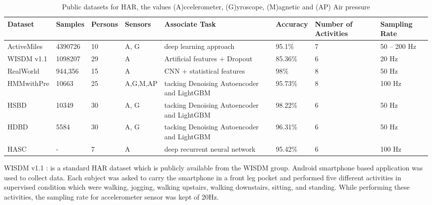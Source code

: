 \documentclass[10pt,halfline,a4paper]{ouparticle}
\begin{document}
\begin{table}[ht]
	\begin{adjustbox}{width=1\textwidth}
	\begin{tabular}{|l|l|l|l|l|l|l|l|}
		\hline
		Dataset     & Samples & Persons & Sensors                                            & Associate Task                             & Accuracy & Number of Activities & Sampling Rate \\ \hline
		ActiveMiles & 4390726                  & 10                & A, G & deep learning approach                     & 95.1\%   & 7                    & 50 – 200 Hz   \\ \hline
		WISDM v1.1  & 1098207                  & 29                & A                                   & Artificial features + Dropout              & 85.36\%  & 6                    & 20 Hz         \\ \hline
		RealWorld   & 944,356                  & 15                & A                                   & CNN + statistical features                 & 98\%     & 8                    & 50 Hz         \\ \hline
		HMMwithPre  & 10663                    & 25                & A,G,M,AP  & tacking Denoising Autoencoder and LightGBM & 95.73\%  & 8                    & 100 Hz        \\ \hline
		HSBD        & 10349                    & 30                & A, G                   & tacking Denoising Autoencoder and LightGBM & 98.22\%  & 6                    & 50 Hz         \\ \hline
		HDBD        & 5584                     & 30                & A, G                      & tacking Denoising Autoencoder and LightGBM & 96.31\%  & 6                    & 50 Hz         \\ \hline
		HASC        & -                        & 7                 & A                              & deep recurrent neural network              & 95.42\%  & 6                    & 100 Hz        \\ \hline
	\end{tabular}
	\end{adjustbox}
	\caption{Public datasets for HAR, the values (A)ccelerometer, (G)yroscope, (M)agnetic and (AP) Air pressure}
\label{joint_dist} 
\end{table}

\noindent WISDM v1.1 \cite{Jennifer}:  is a standard HAR dataset which is publicly available from the WISDM group. Android smartphone based application was used to collect data. Each subject was asked to carry the smartphone in a front leg pocket and performed five different activities in supervised condition which were walking, jogging, walking upstairs, walking downstairs, sitting, and standing. While performing these activities, the sampling rate for accelerometer sensor was kept of 20Hz. \\
\end{document}
